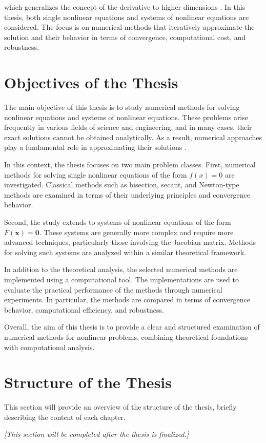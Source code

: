 which generalizes the concept of the derivative to higher dimensions \cite{kelley}.
In this thesis, both single nonlinear equations and systems of nonlinear equations are considered. The focus is on numerical methods that iteratively approximate the solution and their behavior in terms of convergence, computational cost, and robustness.

\section{Objectives of the Thesis}

The main objective of this thesis is to study numerical methods for solving nonlinear equations and systems of nonlinear equations. These problems arise frequently in various fields of science and engineering, and in many cases, their exact solutions cannot be obtained analytically. As a result, numerical approaches play a fundamental role in approximating their solutions \cite{burden, atkinson}.

In this context, the thesis focuses on two main problem classes. First, numerical methods for solving single nonlinear equations of the form \( f(x) = 0 \) are investigated. Classical methods such as bisection, secant, and Newton-type methods are examined in terms of their underlying principles and convergence behavior.

Second, the study extends to systems of nonlinear equations of the form \( F(\mathbf{x}) = \mathbf{0} \). These systems are generally more complex and require more advanced techniques, particularly those involving the Jacobian matrix. Methods for solving such systems are analyzed within a similar theoretical framework.

In addition to the theoretical analysis, the selected numerical methods are implemented using a computational tool. The implementations are used to evaluate the practical performance of the methods through numerical experiments. In particular, the methods are compared in terms of convergence behavior, computational efficiency, and robustness.

Overall, the aim of this thesis is to provide a clear and structured examination of numerical methods for nonlinear problems, combining theoretical foundations with computational analysis.

\section{Structure of the Thesis}

This section will provide an overview of the structure of the thesis, briefly describing the content of each chapter.

\textit{[This section will be completed after the thesis is finalized.]}